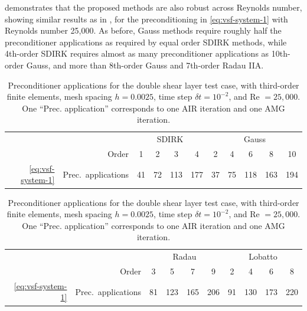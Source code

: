 \documentclass[review]{siamart}
\begin{document}
 demonstrates that the proposed methods are also robust
across Reynolds number, showing similar results as in , for
the preconditioning in \eqref{eq:vsf-system-1} with Reynolds number 25,000.  As
before, Gauss methods require roughly half the preconditioner applications as
required by equal order SDIRK methods, while 4th-order SDIRK requires almost as many
preconditioner applications as 10th-order Gauss, and more than 8th-order Gauss and
7th-order Radau IIA.

\begin{table}[h!]
	\centering
	\caption{Preconditioner applications for the double shear layer test case, with third-order
	finite elements, mesh spacing $h=0.0025$, time step $\delta t = 10^{-2}$, and Re $=25,000$.
	One ``Prec. application'' corresponds to one AIR iteration and one AMG iteration.}
	\label{tab:dsl-iters2}
	\begin{tabular}{rl|cccc|ccccc}
		\toprule
		&& \multicolumn{4}{c|}{SDIRK} & \multicolumn{5}{c}{Gauss} \\
		& \multicolumn{1}{r|}{Order}  & 1 & 2 & 3 & 4 & 2 & 4 & 6 & 8 & 10\\
		\midrule
		\eqref{eq:vsf-system-1} & Prec.\ applications & 41 & 72 & 113 & 177 & 37 & 75 & 118 & 163 & 194 \\
		\bottomrule
	\end{tabular}

	\vspace{\floatsep}

	\begin{tabular}{rl|cccc|cccc}
		\toprule
		&& \multicolumn{4}{c|}{Radau} & \multicolumn{4}{c}{Lobatto} \\
		& \multicolumn{1}{r|}{Order} & 3 & 5 & 7 & 9 & 2 & 4 & 6 & 8\\
		\midrule
		\eqref{eq:vsf-system-1} & Prec.\ applications & 81 & 123 & 165 & 206 & 91 & 130 & 173 & 220 \\
		\bottomrule
	\end{tabular}
\end{table}
\end{document}
